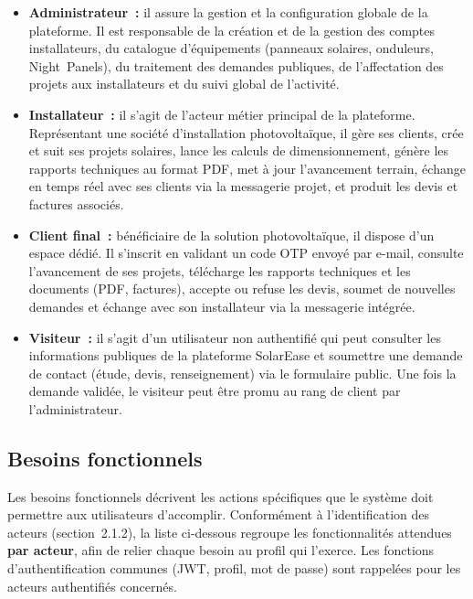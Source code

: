\begin{itemize}[leftmargin=2em, label={$\blacktriangleright$}]
  \item \textbf{Administrateur~:} il assure la gestion et la
    configuration globale de la plateforme. Il est responsable de la
    création et de la gestion des comptes installateurs, du catalogue
    d'équipements (panneaux solaires, onduleurs, Night~Panels), du
    traitement des demandes publiques, de l'affectation des projets aux
    installateurs et du suivi global de l'activité.

  \item \textbf{Installateur~:} il s'agit de l'acteur métier principal
    de la plateforme. Représentant une société d'installation
    photovoltaïque, il gère ses clients, crée et suit ses projets
    solaires, lance les calculs de dimensionnement, génère les rapports
    techniques au format PDF, met à jour l'avancement terrain, échange
    en temps réel avec ses clients via la messagerie projet, et produit
    les devis et factures associés.

  \item \textbf{Client final~:} bénéficiaire de la solution
    photovoltaïque, il dispose d'un espace dédié. Il s'inscrit en
    validant un code OTP envoyé par e-mail, consulte l'avancement de
    ses projets, télécharge les rapports techniques et les documents
    (PDF, factures), accepte ou refuse les devis, soumet de nouvelles
    demandes et échange avec son installateur via la messagerie
    intégrée.

  \item \textbf{Visiteur~:} il s'agit d'un utilisateur non authentifié
    qui peut consulter les informations publiques de la plateforme
    SolarEase et soumettre une demande de contact (étude, devis,
    renseignement) via le formulaire public. Une fois la demande
    validée, le visiteur peut être promu au rang de client par
    l'administrateur.
\end{itemize}

\subsection{Besoins fonctionnels}

Les besoins fonctionnels décrivent les actions spécifiques que le système
doit permettre aux utilisateurs d'accomplir. Conformément à
l'identification des acteurs (section~2.1.2), la liste ci-dessous regroupe
les fonctionnalités attendues \textbf{par acteur}, afin de relier chaque
besoin au profil qui l'exerce. Les fonctions d'authentification communes
(JWT, profil, mot de passe) sont rappelées pour les acteurs authentifiés
concernés.

